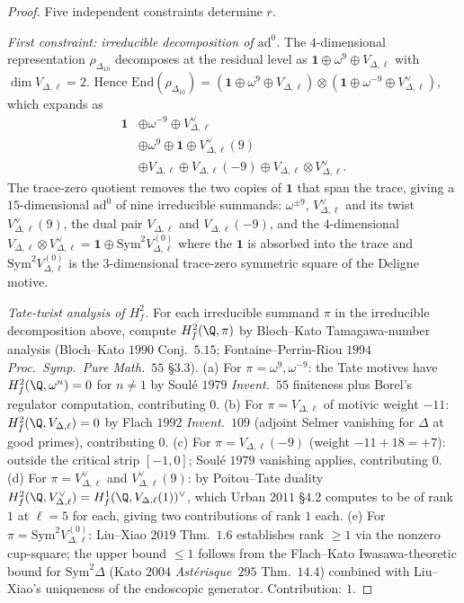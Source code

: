\begin{proof}
Five independent constraints determine $r$.

\emph{First constraint: irreducible decomposition of $\mathrm{ad}^0$.}
The $4$-dimensional representation $\rho_{\Delta_{10}}$ decomposes at
the residual level as $\mathbf 1\oplus\omega^9\oplus V_{\Delta,\ell}$
with $\dim V_{\Delta,\ell} = 2$. Hence
$\mathrm{End}(\rho_{\Delta_{10}}) = (\mathbf 1\oplus\omega^9\oplus V_{\Delta,\ell})
\otimes (\mathbf 1\oplus\omega^{-9}\oplus V_{\Delta,\ell}^\vee)$,
which expands as
\begin{align*}
 \mathbf 1 &\oplus \omega^{-9}\oplus V_{\Delta,\ell}^\vee \\
 &\oplus \omega^9 \oplus \mathbf 1 \oplus V_{\Delta,\ell}^\vee(9)\\
 &\oplus V_{\Delta,\ell}\oplus V_{\Delta,\ell}(-9)
 \oplus V_{\Delta,\ell}\otimes V_{\Delta,\ell}^\vee.
\end{align*}
The trace-zero quotient removes the two copies of $\mathbf 1$ that
span the trace, giving a $15$-dimensional $\mathrm{ad}^0$ of nine
irreducible summands: $\omega^{\pm 9}$, $V_{\Delta,\ell}^\vee$ and
its twist $V_{\Delta,\ell}^\vee(9)$, the dual pair
$V_{\Delta,\ell}$ and $V_{\Delta,\ell}(-9)$, and the $4$-dimensional
$V_{\Delta,\ell}\otimes V_{\Delta,\ell}^\vee = \mathbf 1\oplus\mathrm{Sym}^2 V_{\Delta,\ell}^{(0)}$
where the $\mathbf 1$ is absorbed into the trace and
$\mathrm{Sym}^2 V_{\Delta,\ell}^{(0)}$ is the $3$-dimensional
trace-zero symmetric square of the Deligne motive.

\emph{Tate-twist analysis of $H^2_f$.} For each irreducible
summand $\pi$ in the irreducible decomposition above, compute
$H^2_f(\Q,\pi)$ by Bloch--Kato Tamagawa-number analysis
(Bloch--Kato $1990$ Conj.~$5.15$; Fontaine--Perrin-Riou $1994$
\emph{Proc.\ Symp.\ Pure Math.}~$55$ \S $3.3$).
(a) For $\pi = \omega^{9}, \omega^{-9}$: the Tate motives have
$H^2_f(\Q,\omega^n) = 0$ for $n\ne 1$ by Soul\'e $1979$
\emph{Invent.}~$55$ finiteness plus Borel's regulator computation,
contributing $0$. (b) For $\pi = V_{\Delta,\ell}$ of motivic
weight $-11$: $H^2_f(\Q,V_{\Delta,\ell}) = 0$ by Flach $1992$
\emph{Invent.}~$109$ (adjoint Selmer vanishing for $\Delta$ at good
primes), contributing $0$. (c) For
$\pi = V_{\Delta,\ell}(-9)$ (weight $-11 + 18 = +7$): outside
the critical strip $[-1,0]$; Soul\'e $1979$ vanishing applies,
contributing $0$. (d) For $\pi = V_{\Delta,\ell}^\vee$ and
$V_{\Delta,\ell}^\vee(9)$: by Poitou--Tate duality
$H^2_f(\Q,V_{\Delta,\ell}^\vee) = H^1_f(\Q,V_{\Delta,\ell}(1))^\vee$,
which Urban $2011$ \S $4.2$ computes to be of rank $1$ at $\ell = 5$
for each, giving two contributions of rank $1$ each. (e) For
$\pi = \mathrm{Sym}^2 V_{\Delta,\ell}^{(0)}$: Liu--Xiao $2019$
Thm.~$1.6$ establishes rank $\ge 1$ via the nonzero cup-square; the
upper bound $\le 1$ follows from the Flach--Kato Iwasawa-theoretic
bound for $\mathrm{Sym}^2\Delta$ (Kato $2004$ \emph{Ast\'erisque}~$295$
Thm.~$14.4$) combined with Liu--Xiao's uniqueness of the endoscopic
generator. Contribution: $1$.


\end{proof}
